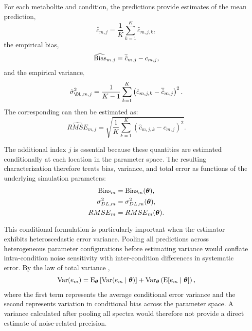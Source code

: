 For each metabolite and condition, the \MC predictions provide estimates of the mean prediction,
\begin{equation}
    \overline{\hat{c}}_{m,j} = \frac{1}{K}\sum_{k=1}^{K}\hat{c}_{m,j,k},
\end{equation}
the empirical bias,
\begin{equation}
    \widehat{\textnormal{Bias}}_{m,j} = \overline{\hat{c}}_{m,j} - c_{m,j},
\end{equation}
and the empirical variance,
\begin{equation}
    \hat{\sigma}_{\DL,m,j}^{2} = \frac{1}{K-1}\sum_{k=1}^{K}\left(\hat{c}_{m,j,k} - \overline{\hat{c}}_{m,j}\right)^{2}.
\end{equation}
The corresponding \RMSE can then be estimated as:
\begin{equation}
    \widehat{RMSE}_{m,j} = \sqrt{\frac{1}{K}\sum_{k=1}^{K}\left(\hat{c}_{m,j,k} - c_{m,j}\right)^{2}}.
\end{equation}

The additional index $j$ is essential because these quantities are estimated conditionally at each location in the parameter space. The resulting characterization therefore treats bias, variance, and total error as functions of the underlying simulation parameters:
\begin{subequations}
\begin{align}
    \textnormal{Bias}_m &= \textnormal{Bias}_m(\boldsymbol{\theta}), \\ \sigma_{DL,m}^{2} &= \sigma_{DL,m}^{2}(\boldsymbol{\theta}), \\ {RMSE}_m &= {RMSE}_m(\boldsymbol{\theta}).
\end{align}
\end{subequations}

This conditional formulation is particularly important when the estimator exhibits heteroscedastic error variance. Pooling all predictions across heterogeneous parameter configurations before estimating variance would conflate intra-condition noise sensitivity with inter-condition differences in systematic error. By the law of total variance \cite{Casella2002}, %
\begin{equation}
\textnormal{Var}(e_m) = \textnormal{E}_{\boldsymbol{\theta}}\left[\textnormal{Var}(e_m\mid\boldsymbol{\theta})\right] + \textnormal{Var}_{\boldsymbol{\theta}}\left(\textnormal{E}[e_m\mid\boldsymbol{\theta}]\right),
\end{equation}
where the first term represents the average conditional error variance and the second represents variation in conditional bias across the parameter space. A variance calculated after pooling all spectra would therefore not provide a direct estimate of noise-related precision.

